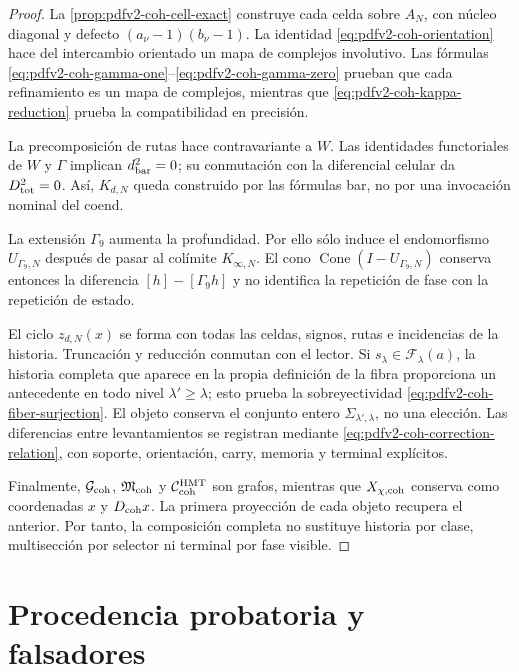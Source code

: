 \begin{proof}
La \cref{prop:pdfv2-coh-cell-exact} construye cada celda sobre \(A_N\), con
núcleo diagonal y defecto \((a_\nu-1)(b_\nu-1)\). La identidad
\eqref{eq:pdfv2-coh-orientation} hace del intercambio orientado un mapa de
complejos involutivo. Las fórmulas
\eqref{eq:pdfv2-coh-gamma-one}--\eqref{eq:pdfv2-coh-gamma-zero} prueban que
cada refinamiento es un mapa de complejos, mientras que
\eqref{eq:pdfv2-coh-kappa-reduction} prueba la compatibilidad en precisión.

La precomposición de rutas hace contravariante a \(W\). Las identidades
functoriales de \(W\) y \(\Gamma\) implican
\(d_{\rm bar}^2=0\); su conmutación con la diferencial celular da
\(D_{\rm tot}^2=0\). Así, \(K_{d,N}\) queda construido por las fórmulas bar,
no por una invocación nominal del coend.

La extensión \(\Gamma_9\) aumenta la profundidad. Por ello sólo induce el
endomorfismo \(U_{\Gamma_9,N}\) después de pasar al colímite
\(K_{\infty,N}\). El cono
\(\operatorname{Cone}(I-U_{\Gamma_9,N})\) conserva entonces la diferencia
\([h]-[\Gamma_9h]\) y no identifica la repetición de fase con la repetición
de estado.

El ciclo \(z_{d,N}(x)\) se forma con todas las celdas, signos, rutas e
incidencias de la historia. Truncación y reducción conmutan con el lector. Si
\(s_\lambda\in\mathscr F_\lambda(a)\), la historia completa que aparece en
la propia definición de la fibra proporciona un antecedente en todo nivel
\(\lambda'\geq\lambda\); esto prueba la sobreyectividad
\eqref{eq:pdfv2-coh-fiber-surjection}. El objeto conserva el conjunto entero
\(\Sigma_{\lambda',\lambda}\), no una elección. Las diferencias entre
levantamientos se registran mediante
\eqref{eq:pdfv2-coh-correction-relation}, con soporte, orientación, carry,
memoria y terminal explícitos.

Finalmente, \(\mathcal G_{\rm coh}\), \(\mathfrak M_{\rm coh}\) y
\(\mathcal C_{\rm coh}^{\rm HMT}\) son grafos, mientras que
\(X_{\chi,{\rm coh}}\) conserva como coordenadas \(x\) y \(D_{\rm coh}x\).
La primera proyección de cada objeto recupera el anterior. Por tanto, la
composición completa no sustituye historia por clase, multisección por
selector ni terminal por fase visible.
\end{proof}

\section{Procedencia probatoria y falsadores}
\label{sec:pdfv2-coh-provenance-falsifiers}

